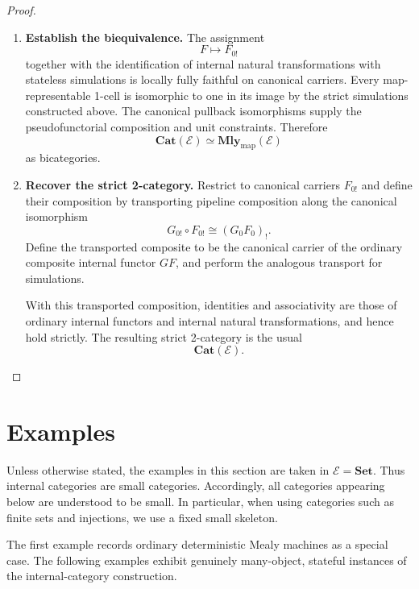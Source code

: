 \begin{proof}
\begin{enumerate}
        \item \textbf{Establish the biequivalence.}
        The assignment
        \[
            F\longmapsto F_{0!}
        \]
        together with the identification of internal natural transformations
        with stateless simulations is locally fully faithful on canonical
        carriers. Every map-representable 1-cell is isomorphic to one in its
        image by the strict simulations constructed above. The canonical
        pullback isomorphisms supply the pseudofunctorial composition and unit
        constraints. Therefore
        \[
            \mathbf{Cat}(\mathcal E)
            \simeq
            \mathbf{Mly}_{\mathrm{map}}(\mathcal E)
        \]
        as bicategories.

        \item \textbf{Recover the strict 2-category.}
        Restrict to canonical carriers \(F_{0!}\) and define their composition
        by transporting pipeline composition along the canonical isomorphism
        \[
            G_{0!}\circ F_{0!}
            \cong
            (G_0F_0)_!.
        \]
        Define the transported composite to be the canonical carrier of the
        ordinary composite internal functor \(GF\), and perform the analogous
        transport for simulations.

        With this transported composition, identities and associativity are
        those of ordinary internal functors and internal natural
        transformations, and hence hold strictly. The resulting strict
        2-category is the usual
        \[
            \mathbf{Cat}(\mathcal E).
        \]
    \end{enumerate}
\end{proof}

\section{Examples}
\label{sec:examples-mealy-morphisms}

Unless otherwise stated, the examples in this section are taken in \(\mathcal E=\mathbf{Set}\). Thus internal categories are small categories. Accordingly, all categories appearing below are understood to be small. In particular, when using categories such as finite sets and injections, we use a fixed small skeleton.

The first example records ordinary deterministic Mealy machines as a special case. The following examples exhibit genuinely many-object, stateful instances of the internal-category construction.

